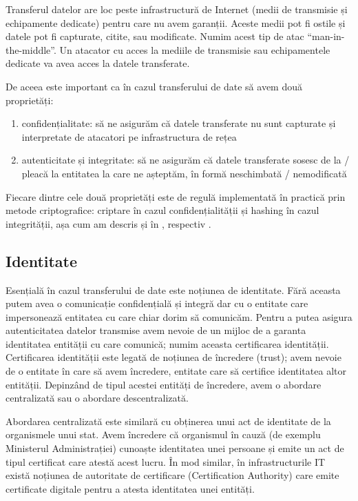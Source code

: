 Transferul datelor are loc peste infrastructură de Internet (medii de transmisie și echipamente dedicate) pentru care nu avem garanții. Aceste medii pot fi ostile și datele pot fi capturate, citite, sau modificate. Numim acest tip de atac “man-in-the-middle”. Un atacator cu acces la mediile de transmisie sau echipamentele dedicate va avea acces la datele transferate.

De aceea este important ca în cazul transferului de date să avem două proprietăți:

\begin{enumerate}
  \item confidențialitate: să ne asigurăm că datele transferate nu sunt capturate și interpretate de atacatori pe infrastructura de rețea
  \item autenticitate și integritate: să ne asigurăm că datele transferate sosesc de la / pleacă la entitatea la care ne așteptăm, în formă neschimbată / nemodificată
\end{enumerate}

Fiecare dintre cele două proprietăți este de regulă implementată în practică prin metode criptografice: criptare în cazul confidențialității și hashing în cazul integrității, așa cum am descris și în , respectiv .

\subsection{Identitate}
\label{sec:sec:identity}

Esențială în cazul transferului de date este noțiunea de identitate. Fără aceasta putem avea o comunicație confidențială și integră dar cu o entitate care impersonează entitatea cu care chiar dorim să comunicăm. Pentru a putea asigura autenticitatea datelor transmise avem nevoie de un mijloc de a garanta identitatea entității cu care comunică; numim aceasta certificarea identității. Certificarea identității este legată de noțiunea de încredere (trust); avem nevoie de o entitate în care să avem încredere, entitate care să certifice identitatea altor entității. Depinzând de tipul acestei entități de încredere, avem o abordare centralizată sau o abordare descentralizată.

Abordarea centralizată este similară cu obținerea unui act de identitate de la organismele unui stat. Avem încredere că organismul în cauză (de exemplu Ministerul Administrației) cunoaște identitatea unei persoane și emite un act de tipul certificat care atestă acest lucru. În mod similar, în infrastructurile IT există noțiunea de autoritate de certificare (Certification Authority) care emite certificate digitale pentru a atesta identitatea unei entități.

